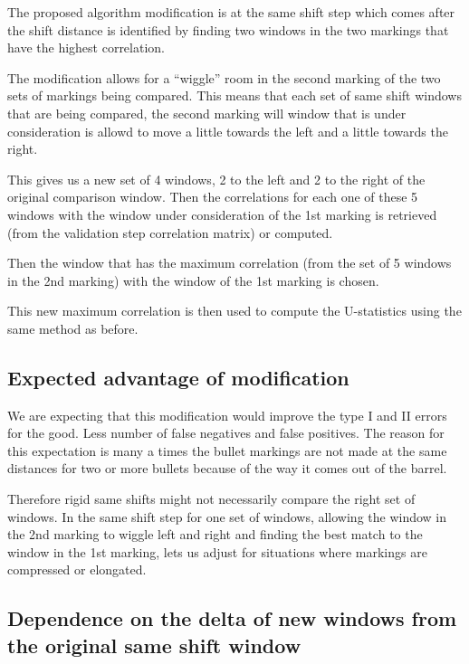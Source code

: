 \documentclass[12pt]{article}
\begin{document}
The proposed algorithm modification is at the same shift step which
comes after the shift distance is identified by finding two windows in
the two markings that have the highest correlation.

The modification allows for a ``wiggle'' room in the second marking of
the two sets of markings being compared. This means that each set of
same shift windows that are being compared, the second marking will
window that is under consideration is allowd to move a little towards
the left and a little towards the right.

This gives us a new set of 4 windows, 2 to the left and 2 to the right
of the original comparison window. Then the correlations for each one of
these 5 windows with the window under consideration of the 1st marking
is retrieved (from the validation step correlation matrix) or computed.

Then the window that has the maximum correlation (from the set of 5
windows in the 2nd marking) with the window of the 1st marking is
chosen.

This new maximum correlation is then used to compute the U-statistics
using the same method as before.

\subsection{Expected advantage of
modification}\label{expected-advantage-of-modification}

We are expecting that this modification would improve the type I and II
errors for the good. Less number of false negatives and false positives.
The reason for this expectation is many a times the bullet markings are
not made at the same distances for two or more bullets because of the
way it comes out of the barrel.

Therefore rigid same shifts might not necessarily compare the right set
of windows. In the same shift step for one set of windows, allowing the
window in the 2nd marking to wiggle left and right and finding the best
match to the window in the 1st marking, lets us adjust for situations
where markings are compressed or elongated.

\subsection{Dependence on the delta of new windows from the original
same shift
window}\label{dependence-on-the-delta-of-new-windows-from-the-original-same-shift-window}
\end{document}
